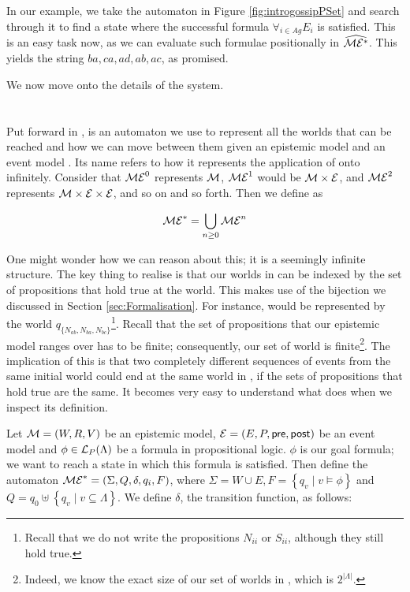 \documentclass[ %
                    author={Leo Poulson},
                supervisor={Dr. Steven Ramsay},
                    degree={BSc},
                     title={Epistemic Planning for the Dynamic Gossip problem},
                  subtitle={},
                      year={2019} ]{dissertation}
\begin{document}
In our example, we take the automaton in Figure \ref{fig:introgossipPSet} and
search through it to find a state where the successful formula $\forall_{i \in
  Ag} E_i$ is satisfied. This is an easy task now, as we can evaluate such
formulae positionally in $\widehat{\mathcal{ME^\ast}}$. This yields the string $ba, ca,
ad, ab, ac$, as promised.

We now move onto the details of the system.

\section{\mestar}
\label{sec:mestar}

Put forward in \cite{AutomataTechniques}, \mestar is an automaton we use to
represent all the worlds that can be reached and how we can move between them
given an epistemic model  and an event model . Its name refers to
how it represents the application of  onto  infinitely. Consider
that $\mathcal{ME}^0$ represents $\mathcal{M}$, $\mathcal{ME}^1$ would be $\mathcal{M} \times
\mathcal{E}$, and $\mathcal{ME}^2$ represents $\mathcal{M} \times \mathcal{E} \times \mathcal{E}$, and so
on and so forth. Then we define \mestar as

\begin{equation*}
  \mathcal{ME}^\ast = \bigcup_{n \geq 0} \mathcal{ME}^n
\end{equation*}

One might wonder how we can reason about this; it is a seemingly infinite
structure. The key thing to realise is that our worlds in \mestar can be indexed
by the set of propositions that hold true at the world. This makes use of the
bijection we discussed in Section \ref{sec:Formalisation}. For instance,
 would be represented by the world $q_{\{N_{ab},
  N_{ba}, N_{bc}\}}$\footnote{Recall that we do not write the propositions $N_{ii}$
  or $S_{ii}$, although they still hold true.}. Recall that the set of propositions
that our epistemic model ranges over has to be finite; consequently, our set of
world is finite\footnote{Indeed, we know the exact size of our set of worlds in
  \mestar, which is $2^{|\Lambda|}$.}. The implication of this is that two
completely different sequences of events from the same initial world could end at the
same world in \mestar, if the sets of propositions that hold true are the same.
It becomes very easy to understand what \mestar does when we inspect its
definition.

Let $\mathcal{M} = (W, R, V)$ be an epistemic model, $\mathcal{E} = (E, P, \textsf{pre},
\textsf{post})$ be an event model and $\phi \in \mathcal{L}_P(\Lambda)$ be a formula in
propositional logic. $\phi$ is our goal formula; we want to reach a state in
which this formula is satisfied. Then define the automaton $\mathcal{ME}^\ast=
(\Sigma, Q, \delta, q_i, F)$, where $\Sigma = W \cup E, F = \left\{ q_v \mid v
  \models \phi \right\}$ and $Q = q_0 \uplus \left\{ q_v \mid v \subseteq
  \Lambda \right\}$. We define $\delta$, the transition function, as follows:
\end{document}
